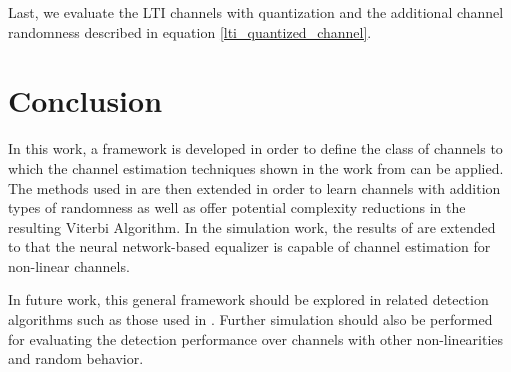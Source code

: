 \par
Last, we evaluate the LTI channels with quantization and the additional channel randomness described in equation \eqref{lti_quantized_channel}. 


\section{Conclusion}
In this work, a framework is developed in order to define the class of channels to which the channel estimation techniques shown in the work from \cite{shlezinger2019viterbinet} can be applied. The methods used in \cite{shlezinger2019viterbinet} are then extended in order to learn channels with addition types of randomness as well as offer potential complexity reductions in the resulting Viterbi Algorithm. 
 In the simulation work, the results of \cite{shlezinger2019viterbinet} are extended to that the neural network-based equalizer is capable of channel estimation for  non-linear channels.
 \par 
 In future work, this general framework should be explored in related detection algorithms such as those used in \cite{shlezinger2020datadriven}. Further simulation should also be performed for evaluating the detection performance over channels with other non-linearities and random behavior. 

